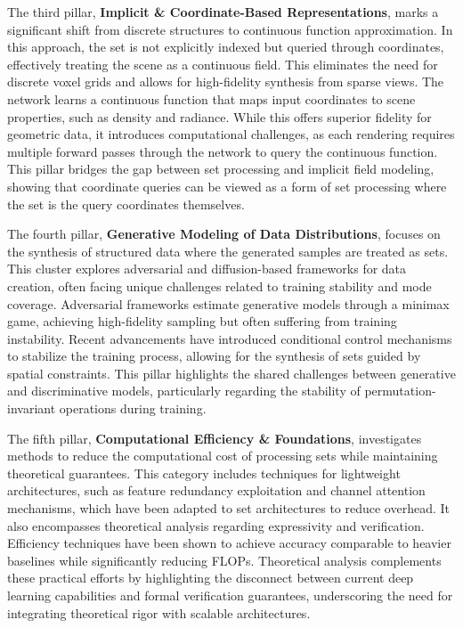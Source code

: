 \documentclass{article}
\begin{document}
The third pillar, \textbf{Implicit \& Coordinate-Based Representations}, marks a significant shift from discrete structures to continuous function approximation. In this approach, the set is not explicitly indexed but queried through coordinates, effectively treating the scene as a continuous field. This eliminates the need for discrete voxel grids and allows for high-fidelity synthesis from sparse views. The network learns a continuous function that maps input coordinates to scene properties, such as density and radiance. While this offers superior fidelity for geometric data, it introduces computational challenges, as each rendering requires multiple forward passes through the network to query the continuous function. This pillar bridges the gap between set processing and implicit field modeling, showing that coordinate queries can be viewed as a form of set processing where the set is the query coordinates themselves.

The fourth pillar, \textbf{Generative Modeling of Data Distributions}, focuses on the synthesis of structured data where the generated samples are treated as sets. This cluster explores adversarial and diffusion-based frameworks for data creation, often facing unique challenges related to training stability and mode coverage. Adversarial frameworks estimate generative models through a minimax game, achieving high-fidelity sampling but often suffering from training instability. Recent advancements have introduced conditional control mechanisms to stabilize the training process, allowing for the synthesis of sets guided by spatial constraints. This pillar highlights the shared challenges between generative and discriminative models, particularly regarding the stability of permutation-invariant operations during training.

The fifth pillar, \textbf{Computational Efficiency \& Foundations}, investigates methods to reduce the computational cost of processing sets while maintaining theoretical guarantees. This category includes techniques for lightweight architectures, such as feature redundancy exploitation and channel attention mechanisms, which have been adapted to set architectures to reduce overhead. It also encompasses theoretical analysis regarding expressivity and verification. Efficiency techniques have been shown to achieve accuracy comparable to heavier baselines while significantly reducing FLOPs. Theoretical analysis complements these practical efforts by highlighting the disconnect between current deep learning capabilities and formal verification guarantees, underscoring the need for integrating theoretical rigor with scalable architectures.
\end{document}
